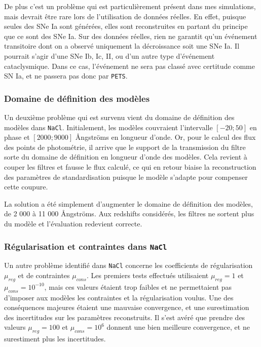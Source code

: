 \documentclass{book}
\def\pets{\texttt{PETS}\xspace}
\def\nacl{\texttt{NaCl}\xspace}
\begin{document}
De plus c'est un problème qui est particulièrement présent dans mes simulations, mais devrait être rare lors de l'utilisation de données réelles. En effet, puisque seules des SNe Ia sont générées, elles sont reconstruites en partant du principe que ce sont des SNe Ia. Sur des données réelles, rien ne garantit qu'un événement transitoire dont on a observé uniquement la décroissance soit une SNe Ia. Il pourrait s'agir d'une SNe Ib, Ic, II, ou d'un autre type d'événement cataclysmique. Dans ce cas, l'événement ne sera pas classé avec certitude comme SN Ia, et ne passera pas donc par \pets.
 

\subsubsection{Domaine de définition des modèles}

Un deuxième problème qui est survenu vient du domaine de définition des modèles dans \nacl. Initialement, les modèles couvraient l'intervalle $[-20; 50]$ en phase et $[2000; 9000]$ Ångströms en longueur d'onde. Or, pour le calcul des flux des points de photométrie, il arrive que le support de la transmission du filtre sorte du domaine de définition en longueur d'onde des modèles. Cela revient à couper les filtres et fausse le flux calculé, ce qui en retour biaise la reconstruction des paramètres de standardisation puisque le modèle s'adapte pour compenser cette coupure.

La solution a été simplement d'augmenter le domaine de définition des modèles, de 2 000 à 11 000 Ångströms. Aux redshifts considérés, les filtres ne sortent plus du modèle et l'évaluation redevient correcte.

\subsubsection{Régularisation et contraintes dans \nacl}

Un autre problème identifié dans \nacl concerne les coefficients de régularisation $\mu_{reg}$ et de contraintes $\mu_{cons}$. Les premiers tests effectués utilisaient $\mu_{reg} = 1$ et $\mu_{cons} = 10^{-10}$, mais ces valeurs étaient trop faibles et ne permettaient pas d'imposer aux modèles les contraintes et la régularisation voulus. Une des conséquences majeures étaient une mauvaise convergence, et une surestimation des incertitudes sur les paramètres reconstruits.
Il s'est avéré que prendre des valeurs $\mu_{reg} = 100$ et $\mu_{cons} = 10^6$ donnent une bien meilleure convergence, et ne surestiment plus les incertitudes.
\end{document}
